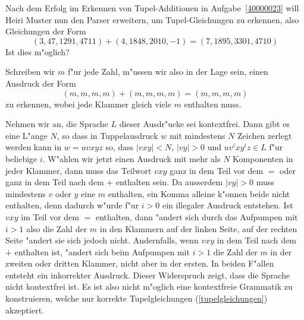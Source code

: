 Nach dem Erfolg im Erkennen von Tupel-Additionen in
Aufgabe~\ref{40000023}
will Heiri Muster nun den Parser erweitern, um Tupel-Gleichungen
zu erkennen, also Gleichungen der Form
\[
(3,47,1291,4711)+(4,1848,2010,-1)=(7,1895,3301,4710)
\]
Ist dies m"oglich?

\begin{loesung}
Schreiben wir $m$ f"ur jede Zahl, m"ussen wir also in der Lage
sein, einen Ausdruck der Form
\begin{equation}
(m,m,m,m)+(m,m,m,m)=(m,m,m,m)
\label{tupelgleichungen}
\end{equation}
zu erkennen, wobei jede Klammer gleich viele $m$ enthalten muss.

Nehmen wir an, die Sprache $L$ dieser Ausdr"ucke sei kontextfrei.
Dann gibt
es eine L"ange $N$, so dass in Tuppelausdruck $w$ mit mindestens
$N$ Zeichen zerlegt werden kann in $w=uvxyz$ so, dass $|vxy|<N$,
$|vy|>0$ und $uv^ixy^iz\in L$ f"ur beliebige $i$. W"ahlen wir jetzt
einen Ausdruck mit mehr als $N$ Komponenten in jeder Klammer,
dann muss das Teilwort $vxy$ ganz in dem Teil vor dem $=$ oder ganz
in dem Teil nach dem $+$ enthalten sein. Da ausserdem $|vy|>0$
muss mindestens $v$ oder $y$ eine $m$ enthalten, ein Komma alleine
k"onnen beide nicht enthalten, denn dadurch w"urde f"ur $i>0$
ein illegaler Ausdruck entstehen. Ist $vxy$ im Teil vor dem $=$
enthalten, dann "andert sich durch das Aufpumpen mit $i>1$ also
die Zahl der $m$ in den Klammern auf der linken Seite, auf
der rechten Seite "andert sie sich jedoch nicht. Andernfalls,
wenn $vxy$ in dem Teil nach dem $+$ enthalten ist, "andert
sich beim Aufpumpen mit $i>1$ die Zahl der $m$ in der zweiten
oder dritten Klammer, nicht aber in der ersten. In beiden F"allen
entsteht ein inkorrekter Ausdruck. Dieser Widerspruch zeigt, dass
die Sprache nicht kontextfrei ist. Es ist also nicht m"oglich
eine kontextfreie Grammatik zu konstruieren, welche nur korrekte
Tupelgleichungen (\ref{tupelgleichungen}) akzeptiert.
\end{loesung}
